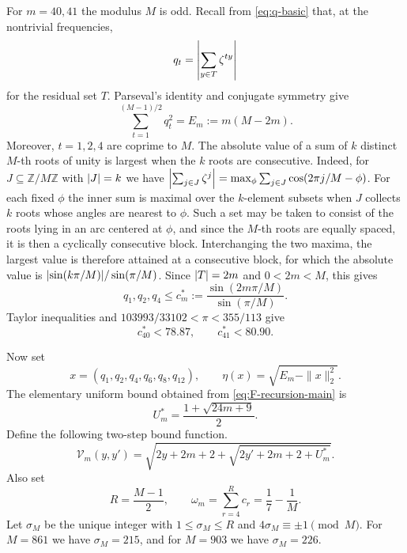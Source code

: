 \documentclass[11pt]{article}
\theoremstyle{definition}
\theoremstyle{remark}
\numberwithin{equation}{section}
\newcommand{\Z}{\mathbb{Z}}
\DeclarePairedDelimiter{\abs}{\lvert}{\rvert}
\newcommand{\cV}{\mathcal V}
\begin{document}
For $m=40,41$ the modulus $M$ is odd. Recall from \eqref{eq:q-basic} that,
at the nontrivial frequencies,
\[
  q_t=\abs*{\sum_{y\in T}\zeta^{ty}}
\]
for the residual set $T$. Parseval's identity and conjugate symmetry give
\begin{equation}\label{eq:parseval-q}
  \sum_{t=1}^{(M-1)/2}q_t^2
  =E_m:=m(M-2m).
\end{equation}
Moreover, $t=1,2,4$ are coprime to $M$. The absolute value of a sum of $k$ distinct $M$-th roots of unity is largest
when the $k$ roots are consecutive. Indeed, for $J\subseteq\Z/M\Z$ with
$\abs J=k$ we have
$\abs*{\sum_{j\in J}\zeta^{j}}=\max_{\phi}\sum_{j\in J}\cos(2\pi j/M-\phi)$.
For each fixed $\phi$ the inner sum is maximal over the $k$-element
subsets when $J$ collects $k$ roots whose angles are nearest to $\phi$. Such
a set may be taken to consist of the roots lying in an arc centered at $\phi$,
and since the $M$-th roots are equally spaced, it is then a cyclically
consecutive block. Interchanging the two maxima, the largest value is therefore attained at
a consecutive block, for which the absolute value is
$\abs*{\sin(k\pi/M)}/\sin(\pi/M)$. Since $\abs T=2m$ and $0<2m<M$, this
gives
\begin{equation}\label{eq:primitive-char}
  q_1,q_2,q_4\le
  c_m^*:=\frac{\sin(2m\pi/M)}{\sin(\pi/M)}.
\end{equation}
Taylor inequalities and $103993/33102<\pi<355/113$ give
\begin{equation}\label{eq:cstar-bounds}
  c_{40}^*<78.87,
  \qquad
  c_{41}^*<80.90.
\end{equation}

Now set
\[
  x=(q_1,q_2,q_4,q_6,q_8,q_{12}),
  \qquad
  \eta(x)=\sqrt{E_m-\|x\|_2^2}.
\]
The elementary uniform bound obtained from \eqref{eq:F-recursion-main} is
\[
  U_m^*=\frac{1+\sqrt{24m+9}}2.
\]
Define the following two-step bound function.
\[
  \cV_m(y,y')=
  \sqrt{2y+2m+2+
  \sqrt{2y'+2m+2+U_m^*}}.
\]
Also set
\[
  R=\frac{M-1}{2},
  \qquad
  \omega_m=\sum_{r=4}^{R}c_r=\frac17-\frac1M.
\]
Let $\sigma_M$ be the unique integer with $1\le\sigma_M\le R$ and $4\sigma_M\equiv\pm1\pmod M$. For $M=861$ we have $\sigma_M=215$, and for $M=903$ we have $\sigma_M=226$.
\end{document}
